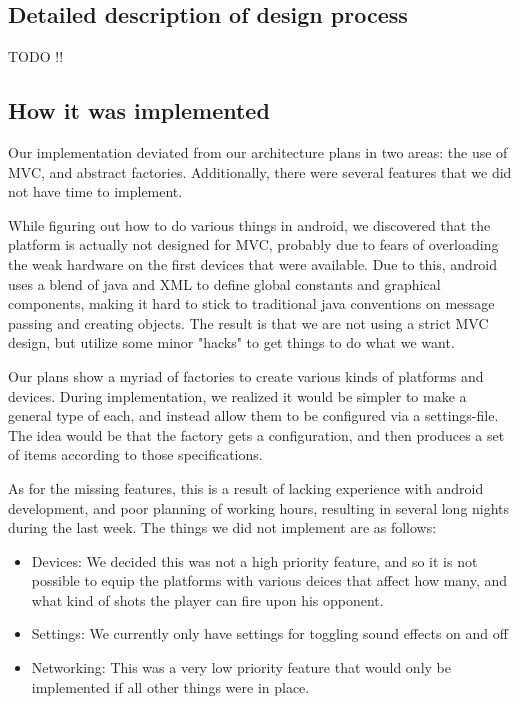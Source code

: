 \documentclass[12pt, a4paper]{article}
\begin{document}
\subsection{Detailed description of design process}
TODO !!
\subsection{How it was implemented}

Our implementation deviated from our architecture plans in two areas: the use of
MVC, and abstract factories. Additionally, there were several features that we
did not have time to implement.

While figuring out how to do various things in android, we discovered that the
platform is actually not designed for MVC, probably due to fears of overloading
the weak hardware on the first devices that were available. Due to this, android
uses a blend of java and XML to define global constants and graphical
components, making it hard to stick to traditional java conventions on message
passing and creating objects. The result is that we are not using a strict MVC
design, but utilize some minor "hacks" to get things to do what we want.

Our plans show a myriad of factories to create various kinds of platforms and
devices. During implementation, we realized it would be simpler to make a
general type of each, and instead allow them to be configured via a
settings-file. The idea would be that the factory gets a configuration, and then
produces a set of items according to those specifications.

As for the missing features, this is a result of lacking experience with android
development, and poor planning of working hours, resulting in several long
nights during the last week. The things we did not implement are as follows:

\begin{itemize}
	\item Devices: 
		\subitem We decided this was not a high priority feature, and so it is
not possible to equip the platforms with various deices that affect how many, and what kind of
shots the player can fire upon his opponent.
	\item Settings:
		\subitem We currently only have settings for toggling sound effects on and off
	\item Networking: 
		\subitem This was a very low priority feature that would only be implemented if all other
things were in place.
\end{itemize}
\end{document}
